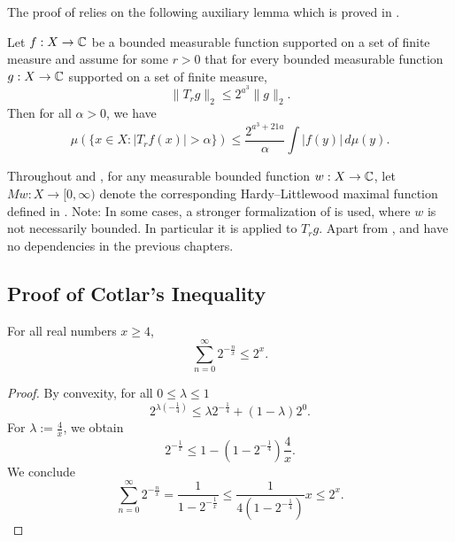 The proof of  relies on the following auxiliary lemma which is proved in .
\begin{lemma}
    \label{calderon-zygmund-weak-1-1}
    \leanok
    Let $f:X\to\mathbb{C}$ be a bounded measurable function supported on a set of finite measure and assume for some $r>0$ that for every bounded measurable function $g:X\to\mathbb{C}$ supported on a set of finite measure,
    \begin{equation}
        \label{eq-strong-2-2-assumption}
        \|T_rg\|_{2}\le 2^{a^3} \|g\|_2.
    \end{equation}
    Then for all $\alpha>0$, we have
    \begin{equation}
        \label{eq-weak-1-1}
        \mu\left(\{x\in X: |T_r f(x)|>\alpha\}\right)\le \frac{2^{a^3 + 21a}}{\alpha} \int |f(y)|\, d\mu(y).
    \end{equation}
\end{lemma}
Throughout  and , for any measurable bounded function $w: X \to \mathbb{C}$, let $Mw: X \to [0, \infty)$ denote the corresponding Hardy--Littlewood maximal function defined in .
Note: In some cases, a stronger formalization of  is used, where $w$ is not necessarily bounded. In particular it is applied to $T_rg$.
Apart from ,  and  have no dependencies in the previous chapters.



\subsection{Proof of Cotlar's Inequality}
\label{subsec-cotlar}

\begin{lemma}
    \label{geometric-series-estimate}
    \leanok
    For all real numbers $x\ge 4$,
    \begin{equation*}
        \sum_{n=0}^\infty 2^{-\frac{n}{x}} \le 2^x.
    \end{equation*}
\end{lemma}
\begin{proof}
    \leanok
    By convexity, for all $0\le\lambda\le1$
    \begin{equation*}
        2^{\lambda(-\frac{1}{4})} \le \lambda 2^{-\frac{1}{4}} + (1-\lambda)2^0.
    \end{equation*}
    For $\lambda:=\frac{4}{x}$, we obtain
    \begin{equation*}
        2^{-\frac 1 x} \le 1 - (1-2^{-\frac 1 4}) \frac{4}{x}.
    \end{equation*}
    We conclude
    \begin{equation*}
        \sum_{n=0}^\infty 2^{-\frac{n}{x}} = \frac{1}{1-2^{-\frac 1 x}} \le \frac{1}{4(1-2^{-\frac 1 4})} x \le 2^x.
    \end{equation*}
\end{proof}

